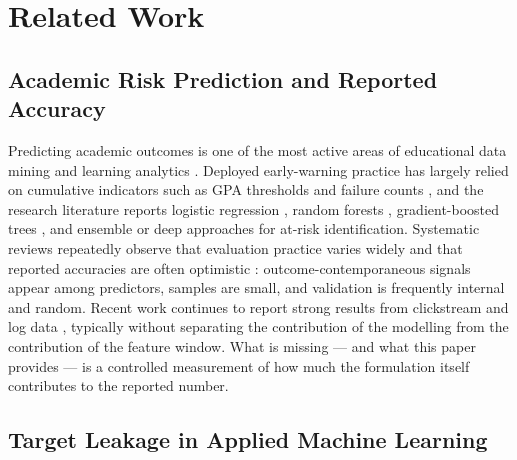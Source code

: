 \documentclass[sn-mathphys,Numbered]{sn-jnl}
\begin{document}
\section{Related Work}\label{sec:related}

\subsection{Academic Risk Prediction and Reported Accuracy}\label{sec:rw_risk}

Predicting academic outcomes is one of the most active areas of educational data mining and learning analytics \cite{Romero2020,ZawackiRichter2019}. Deployed early-warning practice has largely relied on cumulative indicators such as GPA thresholds and failure counts \cite{Jayaprakash2014,Marbouti2016}, and the research literature reports logistic regression \cite{Costa2017}, random forests \cite{Breiman2001,MarquezVera2016}, gradient-boosted trees \cite{Chen2016}, and ensemble or deep approaches \cite{Amrieh2016,Waheed2024} for at-risk identification. Systematic reviews repeatedly observe that evaluation practice varies widely and that reported accuracies are often optimistic \cite{Hellas2018,Whitehill2015}: outcome-contemporaneous signals appear among predictors, samples are small, and validation is frequently internal and random. Recent work continues to report strong results from clickstream and log data \cite{Pecuchova2024,Vaarma2024,Marcolino2025,Mustofa2025,Qiu2022,Wang2021}, typically without separating the contribution of the modelling from the contribution of the feature window. What is missing --- and what this paper provides --- is a controlled measurement of how much the formulation itself contributes to the reported number.

\subsection{Target Leakage in Applied Machine Learning}\label{sec:rw_leakage}
\end{document}
